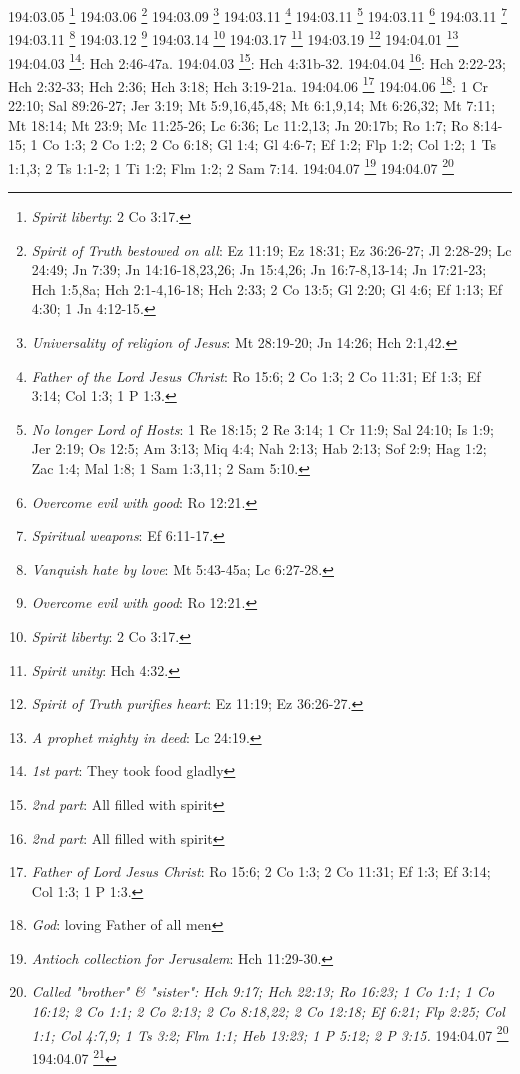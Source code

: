 {{{{{{{{{{{{{{{{{{{{{{{{{{{{{{{{{{{{{{{{{{{{{{{{{{{{{{{{{{{{{{{{{{{{{{{{{{{{{{{{{{{{{{{{{{{{{{{194:03.05 \footnote{\textit{Spirit liberty}: 2 Co 3:17.}
194:03.06 \footnote{\textit{Spirit of Truth bestowed on all}: Ez 11:19; Ez 18:31; Ez 36:26-27; Jl 2:28-29; Lc 24:49; Jn 7:39; Jn 14:16-18,23,26; Jn 15:4,26; Jn 16:7-8,13-14; Jn 17:21-23; Hch 1:5,8a; Hch 2:1-4,16-18; Hch 2:33; 2 Co 13:5; Gl 2:20; Gl 4:6; Ef 1:13; Ef 4:30; 1 Jn 4:12-15.}
194:03.09 \footnote{\textit{Universality of religion of Jesus}: Mt 28:19-20; Jn 14:26; Hch 2:1,42.}
194:03.11 \footnote{\textit{Father of the Lord Jesus Christ}: Ro 15:6; 2 Co 1:3; 2 Co 11:31; Ef 1:3; Ef 3:14; Col 1:3; 1 P 1:3.}
194:03.11 \footnote{\textit{No longer Lord of Hosts}: 1 Re 18:15; 2 Re 3:14; 1 Cr 11:9; Sal 24:10; Is 1:9; Jer 2:19; Os 12:5; Am 3:13; Miq 4:4; Nah 2:13; Hab 2:13; Sof 2:9; Hag 1:2; Zac 1:4; Mal 1:8; 1 Sam 1:3,11; 2 Sam 5:10.}
194:03.11 \footnote{\textit{Overcome evil with good}: Ro 12:21.}
194:03.11 \footnote{\textit{Spiritual weapons}: Ef 6:11-17.}
194:03.11 \footnote{\textit{Vanquish hate by love}: Mt 5:43-45a; Lc 6:27-28.}
194:03.12 \footnote{\textit{Overcome evil with good}: Ro 12:21.}
194:03.14 \footnote{\textit{Spirit liberty}: 2 Co 3:17.}
194:03.17 \footnote{\textit{Spirit unity}: Hch 4:32.}
194:03.19 \footnote{\textit{Spirit of Truth purifies heart}: Ez 11:19; Ez 36:26-27.}
194:04.01 \footnote{\textit{A prophet mighty in deed}: Lc 24:19.}
194:04.03 \footnote{\textit{1st part}: They took food gladly}: Hch 2:46-47a.}
194:04.03 \footnote{\textit{2nd part}: All filled with spirit}: Hch 4:31b-32.}
194:04.04 \footnote{\textit{2nd part}: All filled with spirit}: Hch 2:22-23; Hch 2:32-33; Hch 2:36; Hch 3:18; Hch 3:19-21a.}
194:04.06 \footnote{\textit{Father of Lord Jesus Christ}: Ro 15:6; 2 Co 1:3; 2 Co 11:31; Ef 1:3; Ef 3:14; Col 1:3; 1 P 1:3.}
194:04.06 \footnote{\textit{God}: loving Father of all men}: 1 Cr 22:10; Sal 89:26-27; Jer 3:19; Mt 5:9,16,45,48; Mt 6:1,9,14; Mt 6:26,32; Mt 7:11; Mt 18:14; Mt 23:9; Mc 11:25-26; Lc 6:36; Lc 11:2,13; Jn 20:17b; Ro 1:7; Ro 8:14-15; 1 Co 1:3; 2 Co 1:2; 2 Co 6:18; Gl 1:4; Gl 4:6-7; Ef 1:2; Flp 1:2; Col 1:2; 1 Ts 1:1,3; 2 Ts 1:1-2; 1 Ti 1:2; Flm 1:2; 2 Sam 7:14.}
194:04.07 \footnote{\textit{Antioch collection for Jerusalem}: Hch 11:29-30.}
194:04.07 \footnote{\textit{Called "brother" & "sister": Hch 9:17; Hch 22:13; Ro 16:23; 1 Co 1:1; 1 Co 16:12; 2 Co 1:1; 2 Co 2:13; 2 Co 8:18,22; 2 Co 12:18; Ef 6:21; Flp 2:25; Col 1:1; Col 4:7,9; 1 Ts 3:2; Flm 1:1; Heb 13:23; 1 P 5:12; 2 P 3:15.}
194:04.07 \footnote{\textit{Greeted with holy kiss}: Ro 16:16; 1 Co 16:20; 2 Co 13:12; 1 Ts 5:26; 1 P 5:14.}
194:04.07 \footnote{\textit{Ministered to poor}: Ro 15:26; Gl 2:10.}
}}}}}}}}}}}}}}}}}}}}}}}}}}}}}}}}}}}}}}}}}}}}}}}}}}}}}}}}}}}}}}}}}}}}}}}}}}}}}}}}}}}}}}}}}}}}
